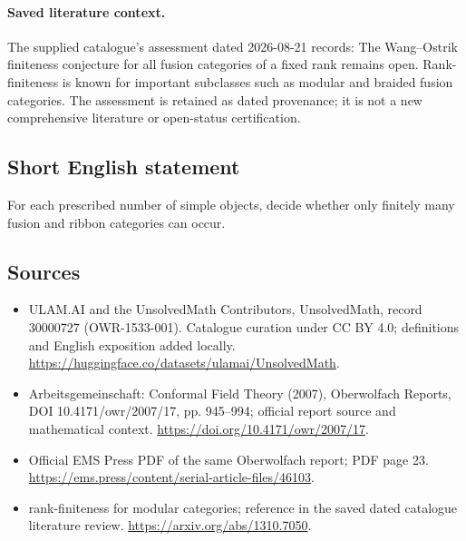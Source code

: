 \documentclass[11pt]{article}
\begin{document}
\paragraph{Saved literature context.} The supplied catalogue's assessment dated 2026-08-21 records: The Wang--Ostrik finiteness conjecture for all fusion categories of a fixed rank remains open. Rank-finiteness is known for important subclasses such as modular and braided fusion categories. The assessment is retained as dated provenance; it is not a new comprehensive literature or open-status certification.
\subsection{Short English statement}
For each prescribed number of simple objects, decide whether only finitely many fusion and ribbon categories can occur.
\subsection{Sources}
\begin{itemize}
\item[\hypertarget{source:30000727:1}{S1}] ULAM.AI and the UnsolvedMath Contributors, UnsolvedMath, record 30000727 (OWR-1533-001). Catalogue curation under CC BY 4.0; definitions and English exposition added locally.
\url{https://huggingface.co/datasets/ulamai/UnsolvedMath}.
\item[\hypertarget{source:30000727:2}{S2}] Arbeitsgemeinschaft: Conformal Field Theory (2007), Oberwolfach Reports, DOI 10.4171/owr/2007/17, pp. 945--994; official report source and mathematical context.
\url{https://doi.org/10.4171/owr/2007/17}.
\item[\hypertarget{source:30000727:3}{S3}] Official EMS Press PDF of the same Oberwolfach report; PDF page 23.
\url{https://ems.press/content/serial-article-files/46103}.
\item[\hypertarget{source:30000727:4}{S4}] rank-finiteness for modular categories; reference in the saved dated catalogue literature review.
\url{https://arxiv.org/abs/1310.7050}.
\end{itemize}
\label{end:30000727}
\end{document}
